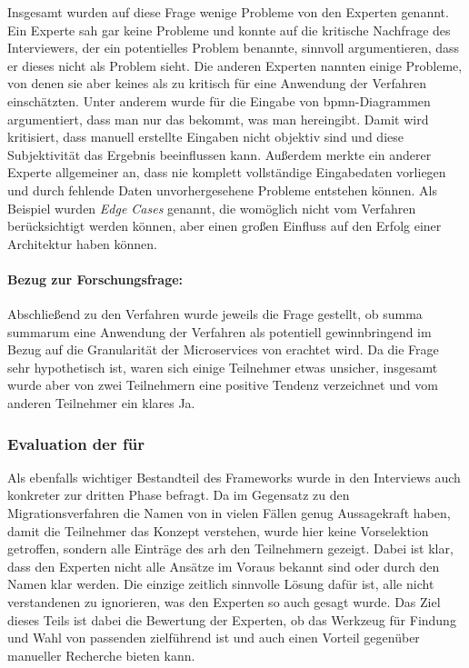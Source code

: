 Insgesamt wurden auf diese Frage wenige Probleme von den Experten genannt.
Ein Experte sah gar keine Probleme und konnte auf die kritische Nachfrage des Interviewers, der ein potentielles Problem benannte, sinnvoll argumentieren, dass er dieses nicht als Problem sieht.
Die anderen Experten nannten einige Probleme, von denen sie aber keines als zu kritisch für eine Anwendung der Verfahren einschätzten.
Unter anderem wurde für die Eingabe von \gls{bpmn}-Diagrammen argumentiert, dass man \glqq nur das bekommt, was man hereingibt\grqq{}.
Damit wird kritisiert, dass manuell erstellte Eingaben nicht objektiv sind und diese Subjektivität das Ergebnis beeinflussen kann.
Außerdem merkte ein anderer Experte allgemeiner an, dass nie komplett vollständige Eingabedaten vorliegen und durch fehlende Daten unvorhergesehene Probleme entstehen können.
Als Beispiel wurden \emph{Edge Cases} genannt, die womöglich nicht vom Verfahren berücksichtigt werden können, aber einen großen Einfluss auf den Erfolg einer Architektur haben können.

\paragraph{Bezug zur Forschungsfrage:} Abschließend zu den Verfahren wurde jeweils die Frage gestellt, ob summa summarum eine Anwendung der Verfahren als potentiell gewinnbringend im Bezug auf die Granularität der Microservices von \jf erachtet wird.
Da die Frage sehr hypothetisch ist, waren sich einige Teilnehmer etwas unsicher, insgesamt wurde aber von zwei Teilnehmern eine positive Tendenz verzeichnet und vom anderen Teilnehmer ein klares \glqq Ja\grqq{}.


\subsubsection{Evaluation der \bpp für \jf}
\label{sec:evaluation-mmf-anwendung-bp-patterns}

Als ebenfalls wichtiger Bestandteil des Frameworks wurde in den Interviews auch konkreter zur dritten Phase befragt.
Da im Gegensatz zu den Migrationsverfahren die Namen von \bpp in vielen Fällen genug Aussagekraft haben, damit die Teilnehmer das Konzept verstehen, wurde hier keine Vorselektion getroffen, sondern alle Einträge des \gls{arh} den Teilnehmern gezeigt.
Dabei ist klar, dass den Experten nicht alle Ansätze im Voraus bekannt sind oder durch den Namen klar werden.
Die einzige zeitlich sinnvolle Lösung dafür ist, alle nicht verstandenen \bpp zu ignorieren, was den Experten so auch gesagt wurde.
Das Ziel dieses Teils ist dabei die Bewertung der Experten, ob das Werkzeug für Findung und Wahl von passenden \bpp zielführend ist und auch einen Vorteil gegenüber manueller Recherche bieten kann.


